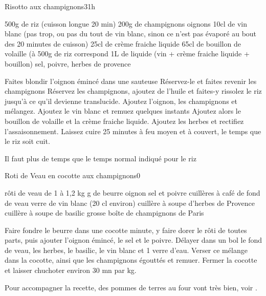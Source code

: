 \begin{recette}{Risotto aux champignons}{3}{1h}{}
\begin{ingredients}
\ingredient 500g de riz (cuisson longue 20 min)
\ingredient 200g de champignons
 oignons
\ingredient 10cl de vin blanc (pas trop, ou pas du tout de vin blanc, sinon ce n'est pas évaporé au bout des 20 minutes de cuisson)
\ingredient 25cl de crème fraiche liquide
\ingredient 65cl de bouillon de volaille (à 500g de riz correspond 1L de liquide (vin + crème fraiche liquide + bouillon)
\ingredient sel, poivre, herbes de provence
\end{ingredients}

\begin{preparation}
\etape Faites blondir l'oignon émincé dans une sauteuse
\etape Réservez-le et faites revenir les champignons
\etape Réservez les champignons, ajoutez de l'huile et faites-y rissolez le riz jusqu'à ce qu'il devienne translucide.
\etape Ajoutez l'oignon, les champignons et mélangez.
\etape Ajoutez le vin blanc et remuez quelques instants 
\etape Ajoutez alors le bouillon de volaille et la crème fraiche liquide. 
\etape Ajoutez les herbes et rectifiez l'assaisonnement.
\etape Laissez cuire 25 minutes à feu moyen et à couvert, le temps que le riz soit cuit. 
\begin{remarque}
Il faut plus de temps que le temps normal indiqué pour le riz
\end{remarque}
\end{preparation}

\end{recette}

\begin{recette}{Roti de Veau en cocotte aux champignons}{0}{}{}
\begin{ingredients}
 rôti de veau de 1 à 1,2 kg
 g de beurre
 oignon
\ingredient sel et poivre
 cuillères à café de fond de veau
 verre de vin blanc (20 cl environ)
 cuillère à soupe d'herbes de Provence
 cuillère à soupe de basilic
 grosse boîte de champignons de Paris
\end{ingredients}

\begin{preparation}
\etape Faire fondre le beurre dans une cocotte minute, y faire dorer le rôti de toutes parts, puis ajouter l'oignon émincé, le sel et le poivre.
\etape Délayer dans un bol le fond de veau, les herbes, le basilic, le vin blanc et 1 verre d'eau. Verser ce mélange dans la cocotte, ainsi que les champignons égouttés et remuer.
\etape Fermer la cocotte et laisser chuchoter environ 30 mn par kg.
\end{preparation}

\begin{remarque}
Pour accompagner la recette, des pommes de terres au four vont très bien, voir .
\end{remarque}
\end{recette}

